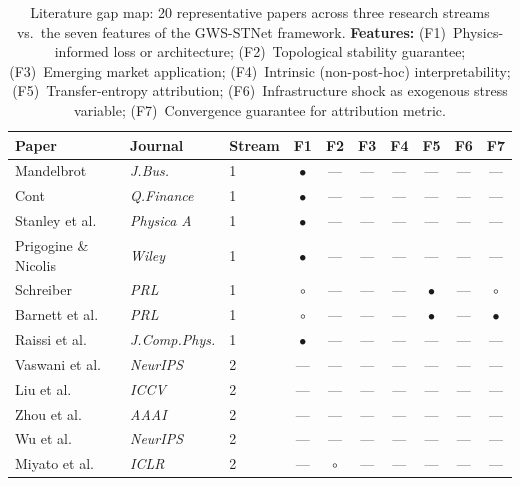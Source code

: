 \documentclass[11pt,a4paper]{article}  %
\theoremstyle{plain}
\theoremstyle{definition}
\theoremstyle{remark}
\begin{document}
\begin{table}[H]
\centering
\caption{Literature gap map: 20 representative papers across three
research streams vs.\ the seven features of the GWS-STNet framework.
\textbf{Features:} (F1)~Physics-informed loss or architecture;
(F2)~Topological stability guarantee; (F3)~Emerging market
application; (F4)~Intrinsic (non-post-hoc) interpretability;
(F5)~Transfer-entropy attribution; (F6)~Infrastructure shock
as exogenous stress variable; (F7)~Convergence guarantee for
attribution metric.}
\label{tab:litmap}
\setlength{\tabcolsep}{3.8pt}
\renewcommand{\arraystretch}{1.05}
\small
\begin{tabular}{lll ccccccc}
\toprule
\textbf{Paper} & \textbf{Journal} & \textbf{Stream}
  & F1 & F2 & F3 & F4 & F5 & F6 & F7 \\
\midrule
Mandelbrot~\cite{Mandelbrot1963}       & \textit{J.Bus.}        & 1 & $\bullet$ & --- & --- & --- & --- & --- & --- \\
Cont~\cite{Cont2001}                   & \textit{Q.Finance}     & 1 & $\bullet$ & --- & --- & --- & --- & --- & --- \\
Stanley et al.~\cite{Stanley1999}      & \textit{Physica A}     & 1 & $\bullet$ & --- & --- & --- & --- & --- & --- \\
Prigogine \& Nicolis~\cite{Prigogine1977}& \textit{Wiley}       & 1 & $\bullet$ & --- & --- & --- & --- & --- & --- \\
Schreiber~\cite{Schreiber2000}         & \textit{PRL}           & 1 & $\circ$   & --- & --- & --- & $\bullet$ & --- & $\circ$ \\
Barnett et al.~\cite{Barnett2009}      & \textit{PRL}           & 1 & $\circ$   & --- & --- & --- & $\bullet$ & --- & $\bullet$ \\
Raissi et al.~\cite{Raissi2019}        & \textit{J.Comp.Phys.}  & 1 & $\bullet$ & --- & --- & --- & --- & --- & --- \\
Vaswani et al.~\cite{Vaswani2017}      & \textit{NeurIPS}       & 2 & --- & --- & --- & --- & --- & --- & --- \\
Liu et al.~\cite{Liu2021}              & \textit{ICCV}          & 2 & --- & --- & --- & --- & --- & --- & --- \\
Zhou et al.~\cite{Zhou2021}            & \textit{AAAI}          & 2 & --- & --- & --- & --- & --- & --- & --- \\
Wu et al.~\cite{Wu2021}                & \textit{NeurIPS}       & 2 & --- & --- & --- & --- & --- & --- & --- \\
Miyato et al.~\cite{Miyato2018}        & \textit{ICLR}          & 2 & --- & $\circ$ & --- & --- & --- & --- & --- \\

\end{tabular}
\end{table}
\end{document}
